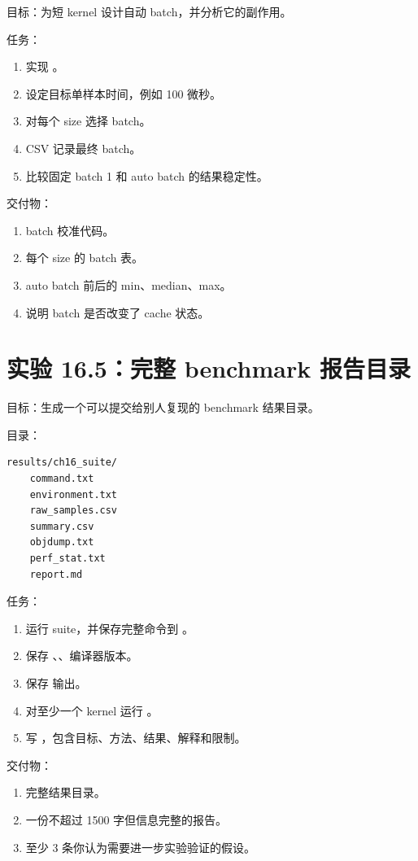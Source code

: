 \begin{labbox}
目标：为短 kernel 设计自动 batch，并分析它的副作用。

任务：

\begin{enumerate}
  \item 实现 。
  \item 设定目标单样本时间，例如 100 微秒。
  \item 对每个 size 选择 batch。
  \item CSV 记录最终 batch。
  \item 比较固定 batch 1 和 auto batch 的结果稳定性。
\end{enumerate}

交付物：

\begin{enumerate}
  \item batch 校准代码。
  \item 每个 size 的 batch 表。
  \item auto batch 前后的 min、median、max。
  \item 说明 batch 是否改变了 cache 状态。
\end{enumerate}
\end{labbox}

\section{实验 16.5：完整 benchmark 报告目录}

\begin{labbox}
目标：生成一个可以提交给别人复现的 benchmark 结果目录。

目录：

\begin{lstlisting}
results/ch16_suite/
    command.txt
    environment.txt
    raw_samples.csv
    summary.csv
    objdump.txt
    perf_stat.txt
    report.md
\end{lstlisting}

任务：

\begin{enumerate}
  \item 运行 suite，并保存完整命令到 。
  \item 保存 、、编译器版本。
  \item 保存  输出。
  \item 对至少一个 kernel 运行 。
  \item 写 ，包含目标、方法、结果、解释和限制。
\end{enumerate}

交付物：

\begin{enumerate}
  \item 完整结果目录。
  \item 一份不超过 1500 字但信息完整的报告。
  \item 至少 3 条你认为需要进一步实验验证的假设。
\end{enumerate}
\end{labbox}

